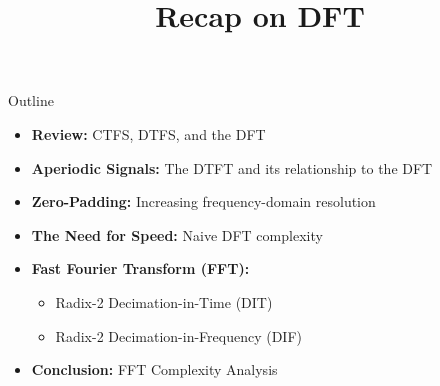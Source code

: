 

\title{Recap on DFT}



\maketitle

\begin{frame}{Outline}
  \begin{itemize}
    \item \textbf{Review:} CTFS, DTFS, and the DFT
    \item \textbf{Aperiodic Signals:} The DTFT and its relationship to the DFT
    \item \textbf{Zero-Padding:} Increasing frequency-domain resolution
    \item \textbf{The Need for Speed:} Naive DFT complexity
    \item \textbf{Fast Fourier Transform (FFT):}
      \begin{itemize}
        \item Radix-2 Decimation-in-Time (DIT)
        \item Radix-2 Decimation-in-Frequency (DIF)
      \end{itemize}
    \item \textbf{Conclusion:} FFT Complexity Analysis
  \end{itemize}
\end{frame}

